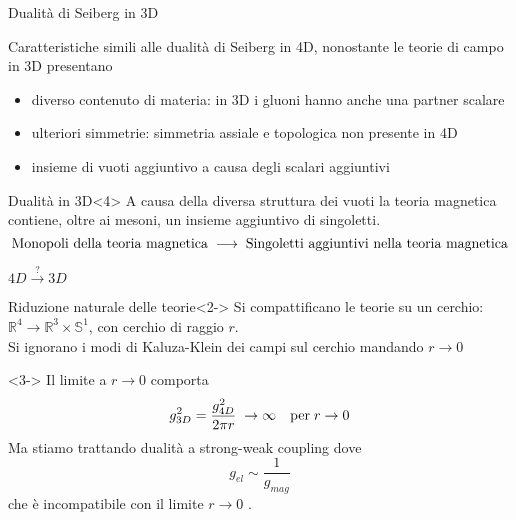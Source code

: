 \documentclass[10pt,compress]{beamer}
\begin{document}
\begin{frame}{Dualità di Seiberg in 3D}
\begin{block}{}
Caratteristiche simili alle dualità di Seiberg in 4D, nonostante le teorie di campo in 3D presentano
\begin{itemize}
\item<1-> diverso contenuto di materia: in 3D i gluoni hanno anche una partner scalare
\item <2-> ulteriori simmetrie: simmetria assiale e topologica non presente in 4D
\item <3-> insieme di vuoti aggiuntivo a causa degli scalari aggiuntivi 
\end{itemize}
\end{block}

\begin{block}{Dualità in 3D}<4>
A causa della diversa struttura dei vuoti la teoria magnetica contiene, oltre ai mesoni, un insieme aggiuntivo di singoletti.
$$
\hbox{Monopoli della teoria magnetica} \; \longrightarrow \; \hbox{Singoletti aggiuntivi nella teoria magnetica}
$$
\end{block}
\end{frame}

\begin{frame}{$4D\overset{?}{ \longrightarrow} 3D $}

\begin{block}{Riduzione naturale delle teorie}<2->
Si compattificano le teorie su un cerchio: $\mathbb{R}^4 \longrightarrow \mathbb{R}^3 \times \mathbb{S}^1$, con  cerchio di raggio $r$.\\
Si ignorano i modi di Kaluza-Klein dei campi sul cerchio mandando $r \rightarrow 0 $
\end{block}








\begin{block}{}<3->
Il limite a $r \rightarrow 0$ comporta
$$
 g^2_{3D} = \frac{g^2_{4D}}{2 \pi r} \; \rightarrow \infty \quad \hbox{per} \; r\rightarrow 0
$$
Ma stiamo trattando dualità a strong-weak coupling dove
$$
g_{el} \sim \frac{1}{g_{mag}}
$$ 
che è incompatibile con il limite $r \rightarrow 0 $ .
\end{block}

\end{frame}
\end{document}
